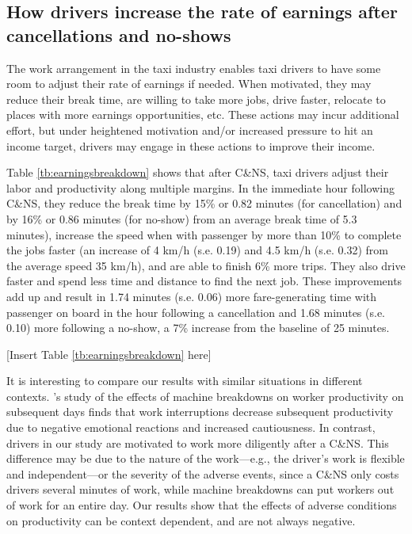 \documentclass[reviewmode,AEJ]{AEA}
\begin{document}
\subsection{How drivers increase the rate of earnings after cancellations and no-shows}
The work arrangement in the taxi industry enables taxi drivers to have some room to adjust their rate of earnings if needed. When motivated, they may reduce their break time, are willing to take more jobs, drive faster, relocate to places with more earnings opportunities, etc. These actions may incur additional effort, but under heightened motivation and/or increased pressure to hit an income target, drivers may engage 
in these actions to improve their income.

Table \ref{tb:earningsbreakdown} shows that after C\&NS, taxi drivers adjust their labor and productivity along multiple margins. In the immediate hour following C\&NS, they reduce the break time by 15\% or 0.82 minutes (for cancellation) and by 16\% or 0.86 minutes (for no-show) from an average break time of 5.3 minutes), increase the speed when with passenger by more than 10\% to complete the jobs faster (an increase of 4 km/h (s.e. 0.19) and 4.5 km/h (s.e. 0.32) from the average speed 35 km/h), and are able to finish 6\% more trips. They also drive faster and spend less time and distance to find the next job. These improvements add up and result in 1.74 minutes (s.e. 0.06) more fare-generating time with passenger on board in the hour following a cancellation and 1.68 minutes (s.e. 0.10) more following a no-show, a 7\% increase from the baseline of 25 minutes.  

\begin{center}
	[Insert Table \ref{tb:earningsbreakdown} here]
\end{center}


It is interesting to compare our results with similar situations in different contexts. 
\citeauthor{cai2017recover}'s \citeyear{cai2017recover} study of the effects of  machine breakdowns on worker 
productivity on subsequent days finds that work interruptions decrease subsequent productivity due to
negative emotional reactions and increased cautiousness. In contrast, drivers in our study are motivated 
to work more diligently after a C\&NS. This difference may be due to the nature of the work---e.g., the 
driver's work is flexible and independent---or the severity of the adverse events, since a C\&NS only costs
drivers several minutes of work, while machine breakdowns can put workers out of work for an entire day.
Our results show that the %
effects of adverse conditions on productivity can be context dependent,
and are not always negative.
\end{document}
